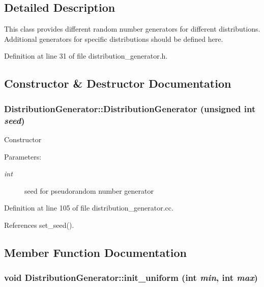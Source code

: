 \subsection{Detailed Description}
This class provides different random number generators for different distributions. Additional generators for specific distributions should be defined here. 

Definition at line 31 of file distribution\_\-generator.h.

\subsection{Constructor \& Destructor Documentation}
\hypertarget{class_distribution_generator_2472817069deda51980e39d36d635991}{
\subsubsection[DistributionGenerator]{\setlength{\rightskip}{0pt plus 5cm}DistributionGenerator::DistributionGenerator (unsigned int {\em seed})}}
\label{class_distribution_generator_2472817069deda51980e39d36d635991}


Constructor \begin{Desc}
\item[Parameters:]
\begin{description}
\item[{\em int}]seed for pseudorandom number generator \end{description}
\end{Desc}


Definition at line 105 of file distribution\_\-generator.cc.

References set\_\-seed().

\subsection{Member Function Documentation}
\hypertarget{class_distribution_generator_fd5fdeedbf8015f742a1d9a4557ce50e}{
\subsubsection[init\_\-uniform]{\setlength{\rightskip}{0pt plus 5cm}void DistributionGenerator::init\_\-uniform (int {\em min}, \/  int {\em max})}}
\label{class_distribution_generator_fd5fdeedbf8015f742a1d9a4557ce50e}


